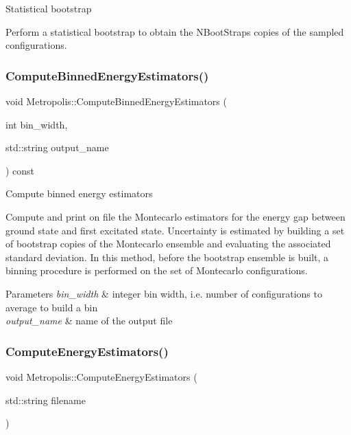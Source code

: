 Statistical bootstrap

Perform a statistical bootstrap to obtain the N\+Boot\+Straps copies of the sampled configurations. \mbox{\label{classMetropolis_aa733da324aa14e6c2fcf9c75f5643cbe}} 
\subsubsection{\texorpdfstring{Compute\+Binned\+Energy\+Estimators()}{ComputeBinnedEnergyEstimators()}}
{\footnotesize\ttfamily void Metropolis\+::\+Compute\+Binned\+Energy\+Estimators (\begin{DoxyParamCaption}\item[{int}]{bin\+\_\+width,  }\item[{std\+::string}]{output\+\_\+name }\end{DoxyParamCaption}) const}

Compute binned energy estimators

Compute and print on file the Montecarlo estimators for the energy gap between ground state and first excitated state. Uncertainty is estimated by building a set of bootstrap copies of the Montecarlo ensemble and evaluating the associated standard deviation. In this method, before the bootstrap ensemble is built, a binning procedure is performed on the set of Montecarlo configurations. 
\begin{DoxyParams}{Parameters}
{\em bin\+\_\+width} & integer bin width, i.\+e. number of configurations to average to build a bin \\
\hline
{\em output\+\_\+name} & name of the output file \\
\hline
\end{DoxyParams}
\mbox{\label{classMetropolis_a197d44f9109ce75781a70441f1d0b2b2}} 
\subsubsection{\texorpdfstring{Compute\+Energy\+Estimators()}{ComputeEnergyEstimators()}}
{\footnotesize\ttfamily void Metropolis\+::\+Compute\+Energy\+Estimators (\begin{DoxyParamCaption}\item[{std\+::string}]{filename }\end{DoxyParamCaption})}

